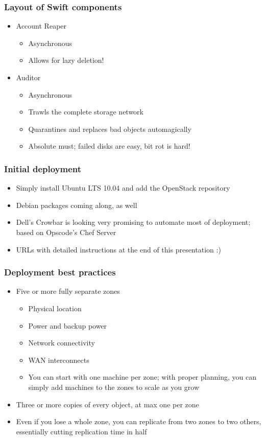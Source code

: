 \documentclass[t]{beamer}
\begin{document}
\begin{frame}
	\frametitle{Layout of Swift components}
	\begin{itemize}
		\item Account Reaper
		\begin{itemize}
			\item Asynchronous
			\item Allows for lazy deletion!
		\end{itemize}
		\item Auditor
		\begin{itemize}
			\item Asynchronous
			\item Trawls the complete storage network
			\item Quarantines and replaces bad objects automagically
			\item Absolute must; failed disks are easy, bit rot is hard!
		\end{itemize}
	\end{itemize}
\end{frame}

\begin{frame}
	\frametitle{Initial deployment}
	\begin{itemize}
		\item Simply install Ubuntu LTS 10.04 and add the OpenStack repository
		\item Debian packages coming along, as well
		\item Dell's Crowbar is looking very promising to automate most of deployment; based on Opscode's Chef Server
		\item URLs with detailed instructions at the end of this presentation :)
	\end{itemize}
\end{frame}

\begin{frame}
	\frametitle{Deployment best practices}
	\begin{itemize}
		\item Five or more fully separate zones
			\begin{itemize}
				\item Physical location
				\item Power and backup power
				\item Network connectivity
				\item WAN interconnects
				\item You can start with one machine per zone; with proper planning, you can simply add machines to the zones to scale as you grow
			\end{itemize}
		\item Three or more copies of every object, at max one per zone
		\item Even if you lose a whole zone, you can replicate from two zones to two others, essentially cutting replication time in half
	\end{itemize}
\end{frame}
\end{document}
